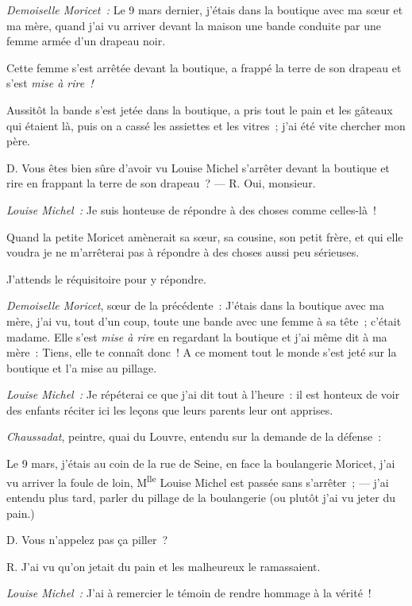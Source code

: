 \documentclass[french,twoside]{book} %
\begin{document}
\noindent \emph{Demoiselle Moricet :} Le 9 mars dernier, j’étais dans la boutique avec ma sœur et ma mère, quand j’ai vu arriver devant la maison une bande conduite par une femme armée d’un drapeau noir.\par
Cette femme s’est arrêtée devant la boutique, a frappé la terre de son drapeau et s’est \emph{mise à rire !}\par
Aussitôt la bande s’est jetée dans la boutique, a pris tout le pain et les gâteaux qui étaient là, puis on a cassé les assiettes et les vitres ; j’ai été vite chercher mon père.\par
D. Vous êtes bien sûre d’avoir vu Louise Michel s’arrêter devant la boutique et rire en frappant la terre de son drapeau ? — R. Oui, monsieur.\par
\emph{Louise Michel :} Je suis honteuse de répondre à des choses comme celles-là !\par
Quand la petite Moricet amènerait sa sœur, sa cousine, son petit frère, et qui elle voudra je ne m’arrêterai pas à répondre à des choses aussi peu sérieuses.\par
J’attends le réquisitoire pour y répondre.\par
\emph{Demoiselle Moricet}, sœur de la précédente : J’étais dans la boutique avec ma mère, j’ai vu, tout d’un coup, toute une bande avec une femme à sa tête ; c’était madame. Elle s’est \emph{mise à rire} en regardant la boutique et j’ai même dit à ma mère : Tiens, elle te connaît donc ! A ce moment tout le monde s’est jeté sur la boutique et l’a mise au pillage.\par
\emph{Louise Michel :} Je répéterai ce que j’ai dit tout à l’heure : il est honteux de voir des enfants réciter ici les leçons que leurs parents leur ont apprises.\par
\emph{Chaussadat}, peintre, quai du Louvre, entendu sur la demande de la défense :\par
Le 9 mars, j’étais au coin de la rue de Seine, en face la boulangerie  Moricet, j’ai vu arriver la foule de loin, M\textsuperscript{lle} Louise Michel est passée sans s’arrêter ; — j’ai entendu plus tard, parler du pillage de la boulangerie (ou plutôt j’ai vu jeter du pain.)\par
D. Vous n’appelez pas ça piller ?\par
R. J’ai vu qu’on jetait du pain et les malheureux le ramassaient.\par
\emph{Louise Michel :} J’ai à remercier le témoin de rendre hommage à la vérité !\par
\end{document}
